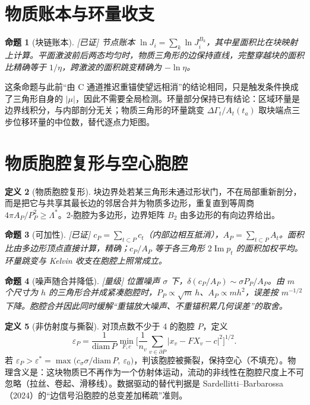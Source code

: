 \documentclass[10.5pt,a4paper]{article}
\theoremstyle{definition}
\newtheorem{definition}{定义}[section]
\theoremstyle{plain}
\newtheorem{proposition}[definition]{命题}
\theoremstyle{remark}
\newcommand{\status}[1]{\hfill{\small\color{accent}\textsf{[#1]}}}
\newcommand{\im}{\operatorname{Im}}
\begin{document}
\section{物质账本与环量收支}

\begin{proposition}[块链账本]\status{已证}
节点账本 $\ln J_i=\sum_k\ln J^{B_k}_i$，其中星面积比在块映射上计算。平面激波前后两态均匀时，物质三角形的边保持直线，完整穿越块的面积比精确等于 $1/\eta$，跨激波的面积跳变精确为 $-\ln\eta$。
\end{proposition}

这条命题与此前“由 C 通道推迟重锚使望远相消”的结论相同，只是触发条件换成了三角形自身的 $|\mu|$，因此不需要全局检测。环量部分保持已有结论：区域环量是边界线积分，与内部剖分无关；物质三角形的环量跳变 $\Delta\Gamma_t/A_t(t_a)$ 取块端点三步位移环量的中位数，替代逐点力矩图。

\section{物质胞腔复形与空心胞腔}\label{sec:cells}

\begin{definition}[物质胞腔复形]
块边界处若某三角形未通过形状门，不在局部重新剖分，而是把它与共享其最长边的邻居合并为物质多边形，重复直到等周商 $4\pi A_P/P_P^2\ge\Lambda^*$。2-胞腔为多边形，边界矩阵 $B_2$ 由多边形的有向边界给出。
\end{definition}

\begin{proposition}[可加性]\status{已证}
$c_P=\sum_{t\subset P}c_t$（内部边相互抵消），$A_P=\sum_{t\subset P}A_t$。面积比由多边形顶点直接计算，精确；$c_P/A_P$ 等于各三角形 $2\im p_t$ 的面积加权平均。环量跳变与 Kelvin 收支在胞腔上照常成立。
\end{proposition}

\begin{proposition}[噪声随合并降低]\status{量级}
位置噪声 $\sigma$ 下，$\delta(c_P/A_P)\sim\sigma P_P/A_P$。由 $m$ 个尺寸为 $h$ 的三角形合并成紧凑胞腔时，$P_P\propto\sqrt m\,h$、$A_P\propto mh^2$，误差按 $m^{-1/2}$ 下降。胞腔合并因此同时缓解“重锚放大噪声、不重锚积累几何误差”的取舍。
\end{proposition}

\begin{definition}[非仿射度与撕裂]
对顶点数不少于 4 的胞腔 $P$，定义
\begin{equation}
\varepsilon_P=\frac{1}{\mathrm{diam}\,P}\min_{F,c}\Big[\frac1{n_v}\sum_{v\in\partial P}|x_v-FX_v-c|^2\Big]^{1/2}.
\end{equation}
若 $\varepsilon_P>\varepsilon^*=\max\big(c_\sigma\sigma/\mathrm{diam}\,P,\ \varepsilon_0\big)$，判该胞腔被撕裂，保持空心（不填充）。物理含义是：这块物质已不再作为一个仿射体运动，流动的非线性在胞腔尺度上不可忽略（拉丝、卷起、滑移线）。数据驱动的替代判据是 Sardellitti–Barbarossa（2024）的“边信号沿胞腔的总变差加稀疏”准则。
\end{definition}
\end{document}
